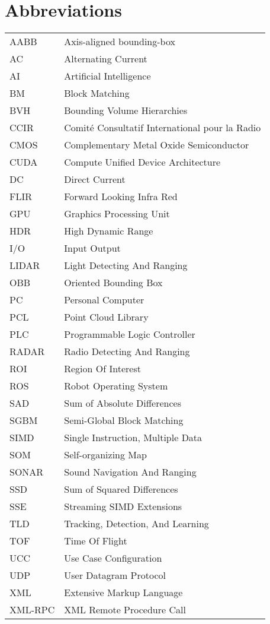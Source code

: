 \documentclass[12pt,a4paper,oneside,pdftex]{report}
\begin{document}
\chapter*{Abbreviations}


\noindent
\begin{longtable}{@{}p{}p{}@{}}
AABB & Axis-aligned bounding-box \\
AC & Alternating Current \\
AI & Artificial Intelligence \\
BM & Block Matching \\
BVH & Bounding Volume Hierarchies \\
CCIR & Comité Consultatif International pour la Radio \\
CMOS & Complementary Metal Oxide Semiconductor \\
CUDA & Compute Unified Device Architecture \\
DC & Direct Current \\
FLIR & Forward Looking Infra Red \\
GPU & Graphics Processing Unit \\
HDR & High Dynamic Range \\
I/O & Input Output\\
LIDAR & Light Detecting And Ranging \\
OBB & Oriented Bounding Box \\
PC & Personal Computer \\
PCL & Point Cloud Library \\
PLC & Programmable Logic Controller \\
RADAR & Radio Detecting And Ranging \\
ROI & Region Of Interest \\
ROS & Robot Operating System \\
SAD & Sum of Absolute Differences \\
SGBM & Semi-Global Block Matching \\
SIMD & Single Instruction, Multiple Data \\
SOM & Self-organizing Map \\
SONAR & Sound Navigation And Ranging \\
SSD & Sum of Squared Differences \\
SSE & Streaming SIMD Extensions \\
TLD & Tracking, Detection, And Learning \\
TOF & Time Of Flight \\
UCC & Use Case Configuration \\
UDP & User Datagram Protocol \\
XML & Extensive Markup Language \\
XML-RPC & XML Remote Procedure Call \\ 
\end{longtable}
\end{document}
